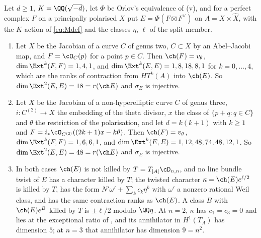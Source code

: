 \begin{theorem}[Twisted certificates at $n=2$ and $n=3$]
\label{thm:twistedcert}
Let $d\ge1$, $K=\QQ(\sqrt{-d})$, let $\Phi$ be Orlov's equivalence of
(v), and for a perfect complex $F$ on a principally
polarised $X$ put $E=\Phi(F\boxtimes F^{\vee})$ on $A=X\times\widehat{X}$,
with the $K$-action of \eqref{eq:Mdef} and the classes $\eta$, $\ell$ of the
split member.
\begin{enumerate}[label=\textup{(\roman*)},leftmargin=2.6em,itemsep=2pt]
\item Let $X$ be the Jacobian of a curve $C$ of genus two, $C\subset X$ by an
  Abel--Jacobi map, and $F=\cO_{C}(p)$ for a point $p\in C$. Then
  $\ch(F)=v_{\theta}$, $\dim\Ext^{k}(F,F)=1,4,1$, and
  $\dim\Ext^{k}(E,E)=1,8,18,8,1$ for $k=0,\dots,4$, which are the ranks of
  contraction from $HT^{k}(A)$ into $\ch(E)$. So
  $\dim\Ext^{2}(E,E)=18=r(\ch E)$ and $\sigma_{E}$ is injective.
\item Let $X$ be the Jacobian of a non-hyperelliptic curve $C$ of genus three,
  $i\colon C^{(2)}\to X$ the embedding of the theta divisor, $x$ the class of
  $\{p+q:q\in C\}$ and $\theta$ the restriction of the polarisation, and let
  $d=k(k+1)$ with $k\ge1$ and $F=i_{*}\cO_{C^{(2)}}((2k+1)x-k\theta)$. Then
  $\ch(F)=v_{\theta}$, $\dim\Ext^{k}(F,F)=1,6,6,1$, and
  $\dim\Ext^{k}(E,E)=1,12,48,74,48,12,1$. So $\dim\Ext^{2}(E,E)=48=r(\ch E)$
  and $\sigma_{E}$ is injective.
\item In both cases $\ch(E)$ is not killed by $T=T_{[A]}\cD_{n,n}$, and no
  line bundle twist of $E$ has a character killed by $T$; the twisted
  character $\kappa=\ch(E)e^{\ell/2}$ is killed by $T$, has the form
  $N'\omega'+\sum_{k}c_{k}\eta^{k}$ with $\omega'$ a nonzero rational Weil
  class, and has the same contraction ranks as $\ch(E)$. A class $B$ with
  $\ch(E)e^{B}$ killed by $T$ is $\pm\ell/2$ modulo $\QQ\eta$. At $n=2$,
  $\kappa$ has $c_{1}=c_{3}=0$ and lies at the exceptional ratio of
  , and its annihilator in $H^{1}(T_{A})$ has
  dimension $5$; at $n=3$ that annihilator has dimension $9=n^{2}$.
\end{enumerate}
\end{theorem}

